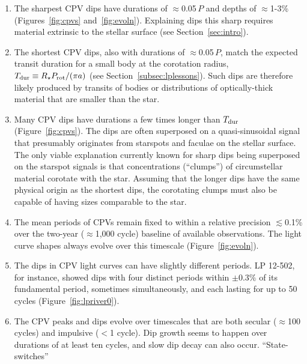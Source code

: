 \documentclass[11pt,twocolumn,tighten,linenumbers]{aastex63}
\begin{document}
\vspace{-2pt}
\begin{enumerate}[leftmargin=*]
	  \setlength\itemsep{-2pt}
%
    \item The sharpest CPV dips have durations of $\approx$0.05\,$P$
      and depths of $\approx$1-3\% (Figures~\ref{fig:cpvs}
      and~\ref{fig:evoln}).  Explaining dips this sharp requires
      material extrinsic to the stellar surface (see
      Section~\ref{sec:intro}).
%
    \item The shortest CPV dips, also with durations of
      $\approx$0.05\,$P$, match the expected transit duration for a
      small body at the corotation radius, $T_{\rm dur} \equiv R_\star
      P_{\rm rot} / (\pi a)$ (see Section~\ref{subsec:lplessons}).
      Such dips are therefore likely produced by transits of bodies or
      distributions of optically-thick material that are smaller than
      the star.
%
    \item Many CPV dips have durations a few times longer than $T_{\rm
      dur}$ (Figure~\ref{fig:cpvs}).  The dips are often superposed on
      a quasi-sinusoidal signal that presumably originates from
      starspots and faculae on the stellar surface.  The only viable
      explanation currently known for sharp dips being superposed on
      the starspot signals is that concentrations (``clumps'') of
      circumstellar material corotate with the star.  Assuming that
      the longer dips have the same physical origin as the shortest
      dips, the corotating clumps must also be capable of having sizes
      comparable to the star.
%
    \item The mean periods of CPVs remain fixed to within a relative
      precision $\lesssim$0.1\% over the two-year ($\approx$1{,}000
      cycle) baseline of available observations.  The light curve
      shapes always evolve over this timescale
      (Figure~\ref{fig:evoln}).
%
    \item The dips in CPV light curves can have slightly different
      periods.  LP 12-502, for instance, showed dips with four
      distinct periods within $\pm 0.3\%$ of its fundamental period,
      sometimes simultaneously, and each lasting for up to 50 cycles
      (Figure~\ref{fig:lpriver0}).
%
    \item The CPV peaks and dips evolve over timescales that are both
      secular ($\approx$100\,cycles) and impulsive ($<$1 cycle).  Dip
      growth seems to happen over durations of at least ten cycles,
      and slow dip decay can also occur.  ``State-switches''

\end{enumerate}
\end{document}
